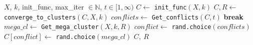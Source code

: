 \documentclass[10pt,twocolumn,letterpaper]{article}
\begin{document}
\begin{algorithmic}[1]
    \label{alg:imprv-kmeans}
    \Require $X$, $k$, init\_func, max\_iter $ \in \mathbb{N}$, $t \in [1, \infty)$
    \State $C \gets$ \texttt{init\_func}$(X, k)$
    \State
    \State $C,R \gets$ \texttt{converge\_to\_clusters}$(C, X, k)$
    \State
    \State $conflicts \gets$ \texttt{Get\_conflicts}$(C, t)$
    \State
    \State \textbf{break}
    \EndIf
    \State
    \State $mega\_cl \gets$ \texttt{Get\_mega\_cluster}$(X, k, R)$
    \State
    \State $conflict \gets$ \texttt{rand.choice}$(conflicts)$
    \State $C[conflict] \gets$ \texttt{rand.choice}$(mega\_cl)$
    \EndFor
    \State \Return $C,~R$
\end{algorithmic}

\end{document}
